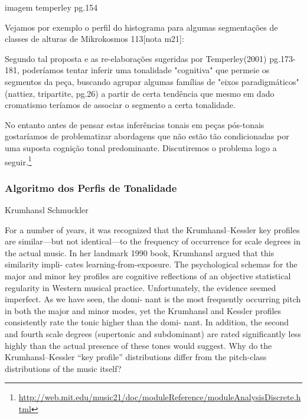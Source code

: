 \documentclass[
	12pt,				%
	openright,			%
	twoside,			%
	a4paper,			%
	english,			%
	french,				%
	spanish,			%
	brazil				%
	]{abntex2}
\begin{document}
imagem temperley pg.154



Vejamos por exemplo o perfil do histograma para algumas segmentações de classes de alturas de Mikrokosmos 113[nota m21]:




Segundo tal proposta e as re-elaborações sugeridas por Temperley(2001) pg.173-181, poderíamos tentar inferir uma tonalidade "cognitiva" que permeie os segmentos da peça, buscando agrupar algumas famílias de "eixos paradigmáticos"(nattiez, tripartite, pg.26) a partir de certa tendência que mesmo em dado cromatismo teríamos de associar o segmento a certa tonalidade.

No entanto antes de pensar estas inferências tonais em peças pós-tonais gostaríamos de problematizar abordagens que não estão tão condicionadas por uma suposta cognição tonal predominante. Discutiremos o problema logo a seguir.\footnote{\url{http://web.mit.edu/music21/doc/moduleReference/moduleAnalysisDiscrete.html}} 


\cite{temperley1999s}


\subsubsection{Algoritmo dos Perfis de Tonalidade}
 
Krumhansl Schmuckler 



For a number of years, it was recognized that the Krumhansl–Kessler key profiles are
similar—but not identical—to the frequency of occurrence for scale degrees in the
actual music. In her landmark 1990 book, Krumhansl argued that this similarity impli-
cates learning-from-exposure. The psychological schemas for the major and minor key
profiles are cognitive reflections of an objective statistical regularity in Western musical
practice. Unfortunately, the evidence seemed imperfect. As we have seen, the domi-
nant is the most frequently occurring pitch in both the major and minor modes, yet
the Krumhansl and Kessler profiles consistently rate the tonic higher than the domi-
nant. In addition, the second and fourth scale degrees (supertonic and subdominant)
are rated significantly less highly than the actual presence of these tones would
suggest. Why do the Krumhansl–Kessler “key profile” distributions differ from the
pitch-class distributions of the music itself?
\end{document}

